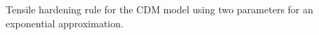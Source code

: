 \label{fig:conctens} Tensile hardening rule for the CDM model using two parameters for an exponential approximation. 